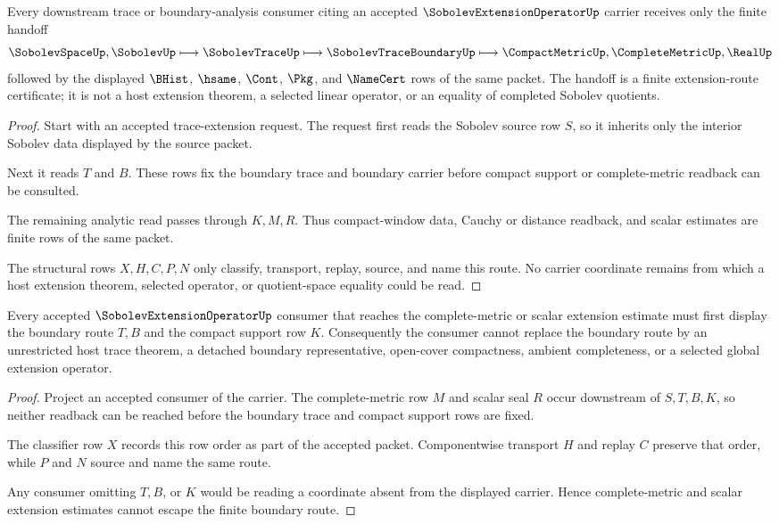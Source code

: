\begin{theorem}
\label{thm:sobolev-extension-operator-trace-extension-handoff}
Every downstream trace or boundary-analysis consumer citing an accepted $\SobolevExtensionOperatorUp$ carrier receives only the finite handoff
$$
\SobolevSpaceUp,\SobolevUp \longmapsto \SobolevTraceUp \longmapsto \SobolevTraceBoundaryUp \longmapsto \CompactMetricUp,\CompleteMetricUp,\RealUp
$$
followed by the displayed $\BHist$, $\hsame$, $\Cont$, $\Pkg$, and $\NameCert$ rows of the same packet. The handoff is a finite extension-route certificate; it is not a host extension theorem, a selected linear operator, or an equality of completed Sobolev quotients.
\end{theorem}
\begin{proof}
Start with an accepted trace-extension request. The request first reads the Sobolev source row $S$, so it inherits only the interior Sobolev data displayed by the source packet.

Next it reads $T$ and $B$. These rows fix the boundary trace and boundary carrier before compact support or complete-metric readback can be consulted.

The remaining analytic read passes through $K,M,R$. Thus compact-window data, Cauchy or distance readback, and scalar estimates are finite rows of the same packet.

The structural rows $X,H,C,P,N$ only classify, transport, replay, source, and name this route. No carrier coordinate remains from which a host extension theorem, selected operator, or quotient-space equality could be read.
\end{proof}

\begin{theorem}
\label{thm:sobolev-extension-operator-nonescape-boundary}
Every accepted $\SobolevExtensionOperatorUp$ consumer that reaches the complete-metric or scalar extension estimate must first display the boundary route $T,B$ and the compact support row $K$. Consequently the consumer cannot replace the boundary route by an unrestricted host trace theorem, a detached boundary representative, open-cover compactness, ambient completeness, or a selected global extension operator.
\end{theorem}
\begin{proof}
Project an accepted consumer of the carrier. The complete-metric row $M$ and scalar seal $R$ occur downstream of $S,T,B,K$, so neither readback can be reached before the boundary trace and compact support rows are fixed.

The classifier row $X$ records this row order as part of the accepted packet. Componentwise transport $H$ and replay $C$ preserve that order, while $P$ and $N$ source and name the same route.

Any consumer omitting $T,B$, or $K$ would be reading a coordinate absent from the displayed carrier. Hence complete-metric and scalar extension estimates cannot escape the finite boundary route.
\end{proof}

